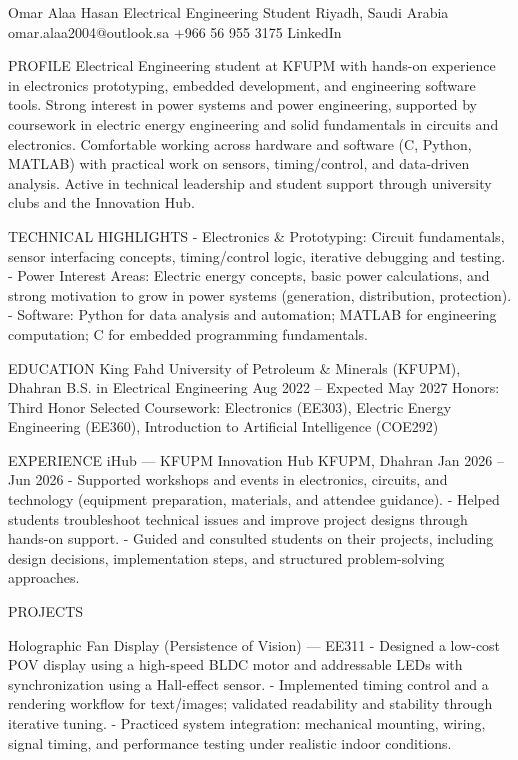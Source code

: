 Omar Alaa Hasan
Electrical Engineering Student
Riyadh, Saudi Arabia
omar.alaa2004@outlook.sa
+966 56 955 3175
LinkedIn

PROFILE
Electrical Engineering student at KFUPM with hands-on experience in electronics prototyping, embedded development, and engineering software tools. Strong interest in power systems and power engineering, supported by coursework in electric energy engineering and solid fundamentals in circuits and electronics. Comfortable working across hardware and software (C, Python, MATLAB) with practical work on sensors, timing/control, and data-driven analysis. Active in technical leadership and student support through university clubs and the Innovation Hub.

TECHNICAL HIGHLIGHTS
- Electronics & Prototyping: Circuit fundamentals, sensor interfacing concepts, timing/control logic, iterative debugging and testing.
- Power Interest Areas: Electric energy concepts, basic power calculations, and strong motivation to grow in power systems (generation, distribution, protection).
- Software: Python for data analysis and automation; MATLAB for engineering computation; C for embedded programming fundamentals.

EDUCATION
King Fahd University of Petroleum & Minerals (KFUPM), Dhahran
B.S. in Electrical Engineering
Aug 2022 – Expected May 2027
Honors: Third Honor
Selected Coursework: Electronics (EE303), Electric Energy Engineering (EE360), Introduction to Artificial Intelligence (COE292)

EXPERIENCE
iHub — KFUPM Innovation Hub
KFUPM, Dhahran
Jan 2026 – Jun 2026
- Supported workshops and events in electronics, circuits, and technology (equipment preparation, materials, and attendee guidance).
- Helped students troubleshoot technical issues and improve project designs through hands-on support.
- Guided and consulted students on their projects, including design decisions, implementation steps, and structured problem-solving approaches.

PROJECTS

Holographic Fan Display (Persistence of Vision) — EE311
- Designed a low-cost POV display using a high-speed BLDC motor and addressable LEDs with synchronization using a Hall-effect sensor.
- Implemented timing control and a rendering workflow for text/images; validated readability and stability through iterative tuning.
- Practiced system integration: mechanical mounting, wiring, signal timing, and performance testing under realistic indoor conditions.

